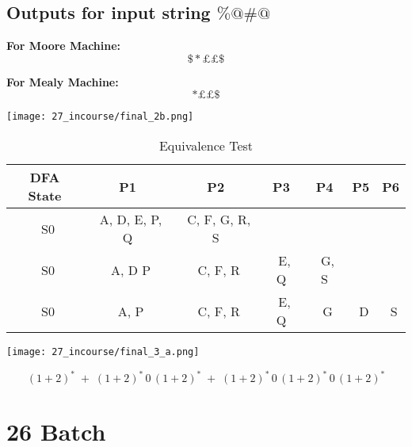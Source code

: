 \documentclass[8pt]{article}
\begin{document}
\bigskip


\subsection*{Outputs for input string \(\% @ \# @\)}

\textbf{For Moore Machine:}
\[
\$ * \pounds \pounds \$
\]

\textbf{For Mealy Machine:}
\[
* \pounds \pounds \$
\]

\begin{center}
    \texttt{[image: 27\_incourse/final\_2b.png]} %
\end{center}


\begin{table}[H]
    \centering
    \renewcommand{\arraystretch}{1.3} %
    \begin{tabular}{|c|c|c|c|c|c|c|}
        \hline
        \rowcolor{gray!20} %
        \textbf{DFA State} & \textbf{P1} & \textbf{P2} & \textbf{P3} & \textbf{P4} & \textbf{P5} & \textbf{P6} \\
        \hline
        \ S0 & \ A, D, E, P, Q & \ C, F, G, R, S & \ & \ &\ &\ \\
        \hline
         \ S0 & \ A, D P & \ C, F, R & \ E, Q & \ G, S &\ &\ \\
        \hline
         \ S0 & \ A,  P & \ C, F, R & \ E, Q & \ G &\ D  &\ S \\
        \hline
        
       
    \end{tabular}
    \caption{Equivalence Test}
    \label{tab:dfa_transition}
\end{table}

\begin{center}
    \texttt{[image: 27\_incourse/final\_3\_a.png]} %
\end{center}

\[
(1 + 2)^{*} \;+\; (1 + 2)^{*} \, 0 \, (1 + 2)^{*} \;+\; (1 + 2)^{*} \, 0 \, (1 + 2)^{*} \, 0 \, (1 + 2)^{*}
\]

\section{26 Batch}
\end{document}
